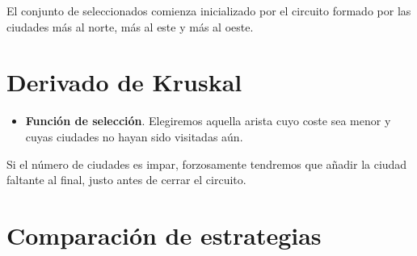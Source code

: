 \documentclass[12pt,spanish]{article}
\begin{document}
El conjunto de seleccionados comienza inicializado por el circuito formado por las ciudades más al norte, más al este y más al oeste.

\section{Derivado de Kruskal}

\begin{itemize}
	\item \textbf{Función de selección}. Elegiremos aquella arista cuyo coste sea menor y cuyas ciudades no hayan sido visitadas aún.
\end{itemize}

Si el número de ciudades es impar, forzosamente tendremos que añadir la ciudad faltante al final, justo antes de cerrar el circuito.


\section{Comparación de estrategias}

\end{document}
